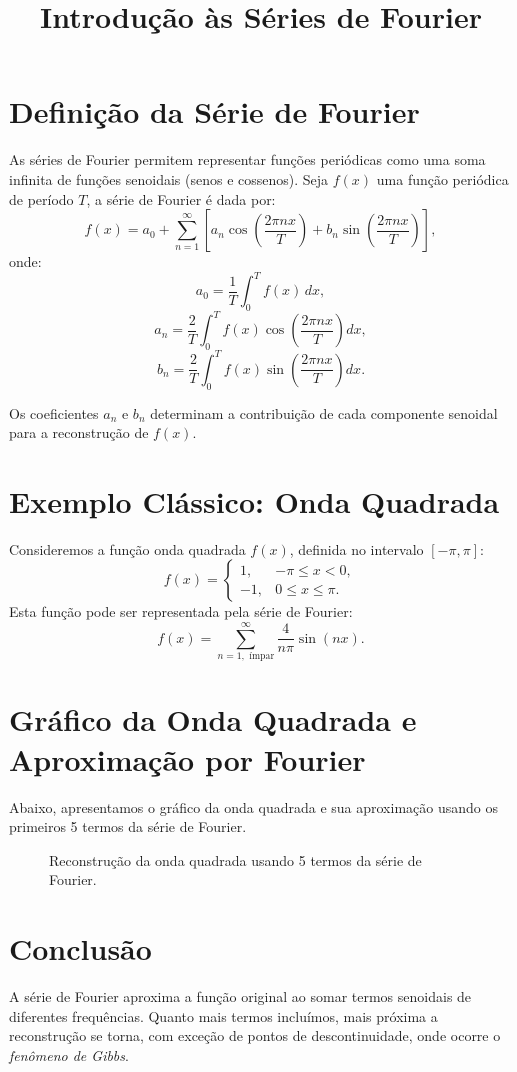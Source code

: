 \documentclass[a4paper,12pt]{article}
\title{Introdução às Séries de Fourier}
\author{}
\date{}
\begin{document}
\maketitle

\section*{Definição da Série de Fourier}
As séries de Fourier permitem representar funções periódicas como uma soma infinita de funções senoidais (senos e cossenos). Seja $f(x)$ uma função periódica de período $T$, a série de Fourier é dada por:
\[
f(x) = a_0 + \sum_{n=1}^\infty \left[ a_n \cos\left(\frac{2\pi n x}{T}\right) + b_n \sin\left(\frac{2\pi n x}{T}\right) \right],
\]
onde:
\[
a_0 = \frac{1}{T} \int_{0}^{T} f(x) \, dx,
\]
\[
a_n = \frac{2}{T} \int_{0}^{T} f(x) \cos\left(\frac{2\pi n x}{T}\right) dx,
\]
\[
b_n = \frac{2}{T} \int_{0}^{T} f(x) \sin\left(\frac{2\pi n x}{T}\right) dx.
\]

Os coeficientes $a_n$ e $b_n$ determinam a contribuição de cada componente senoidal para a reconstrução de $f(x)$.

\section*{Exemplo Clássico: Onda Quadrada}
Consideremos a função onda quadrada $f(x)$, definida no intervalo $[-\pi, \pi]$:
\[
f(x) = 
\begin{cases} 
1, & -\pi \leq x < 0, \\
-1, & 0 \leq x \leq \pi.
\end{cases}
\]
Esta função pode ser representada pela série de Fourier:
\[
f(x) = \sum_{n=1, \text{ ímpar}}^\infty \frac{4}{n\pi} \sin(nx).
\]

\section*{Gráfico da Onda Quadrada e Aproximação por Fourier}
Abaixo, apresentamos o gráfico da onda quadrada e sua aproximação usando os primeiros 5 termos da série de Fourier.

\begin{figure}[h!]
\centering
{}
\caption{Reconstrução da onda quadrada usando 5 termos da série de Fourier.}
\end{figure}

\section*{Conclusão}
A série de Fourier aproxima a função original ao somar termos senoidais de diferentes frequências. Quanto mais termos incluímos, mais próxima a reconstrução se torna, com exceção de pontos de descontinuidade, onde ocorre o \emph{fenômeno de Gibbs}.
\end{document}
